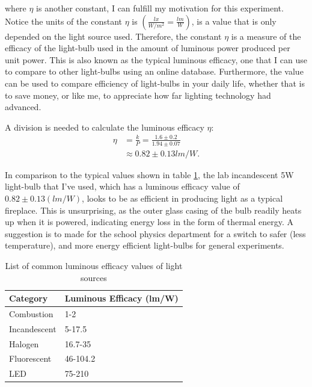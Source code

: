 \documentclass[a4paper,12pt]{article}
\begin{document}
where $\eta$ is another constant, I can fulfill my motivation for this experiment. Notice the units of the constant $\eta$ is $(\frac{\si{lx}}{\si{W\per m^2}} = \frac{\si{lm}}{\si{W}})$, is a value that is only depended on the light source used. Therefore, the constant $\eta$ is a measure of the efficacy of the light-bulb used in the amount of luminous power produced per unit power. This is also known as the typical luminous efficacy, one that I can use to compare to other light-bulbs using an online database. Furthermore, the value can be used to compare efficiency of light-bulbs in your daily life, whether that is to save money, or like me, to appreciate how far lighting technology had advanced.

A division is needed to calculate the luminous efficacy $\eta$:
\begin{align*}
    \eta &= \frac{k}{P} = \frac{1.6 \pm 0.2}{1.94 \pm 0.07}\\
    &\approx 0.82 \pm 0.13 \si{lm\per W}.
\end{align*}

In comparison to the typical values shown in table \ref{tbl:leff}, the lab incandescent 5W light-bulb that I've used, which has a luminous efficacy value of $0.82 \pm 0.13 (\si{lm\per W})$, looks to be as efficient in producing light as a typical fireplace. This is unsurprising, as the outer glass casing of the bulb readily heats up when it is powered, indicating energy loss in the form of thermal energy. A suggestion is to made for the school physics department for a switch to safer (less temperature), and more energy efficient light-bulbs for general experiments.

\begin{table}[H]
    \centering
    \begin{tabular}{l|l}
        Category     & Luminous Efficacy (lm/W) \\ \hline
        Combustion   & 1-2                      \\
        Incandescent & 5-17.5                   \\
        Halogen      & 16.7-35                  \\
        Fluorescent  & 46-104.2                 \\
        LED          & 75-210
    \end{tabular}
    \caption{List of common luminous efficacy values of light sources \parencite{le_value1} \parencite{le_value2} \parencite{le_value3} \parencite{le_value4}}
    \label{tbl:leff}
\end{table}
\end{document}
